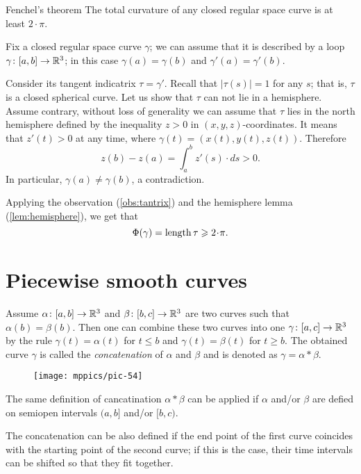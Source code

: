 \begin{thm}{Fenchel's theorem}\label{thm:fenchel}
The total curvature of any closed regular space curve is at least $2\cdot\pi$.
\end{thm}

Fix a closed regular space curve $\gamma$;
we can assume that it is described by a loop $\gamma\colon[a,b]\to \mathbb{R}^3$;
in this case $\gamma(a)=\gamma(b)$ and $\gamma'(a)=\gamma'(b)$.

Consider its tangent indicatrix $\tau=\gamma'$.
Recall that $|\tau(s)|=1$ for any $s$; that is, $\tau$ is a closed spherical curve.
Let us show that $\tau$ can not lie in a hemisphere.
Assume contrary, without loss of generality we can assume that $\tau$ lies in the north hemisphere defined by the inequality $z>0$ in $(x,y,z)$-coordinates.
It means that $z'(t)>0$ at any time, where $\gamma(t)=(x(t), y(t), z(t))$.
Therefore 
\[z(b)-z(a)=\int_a^bz'(s)\cdot ds>0.\]
In particular, $\gamma(a)\ne \gamma(b)$, a contradiction.

Applying the observation (\ref{obs:tantrix}) and the hemisphere lemma (\ref{lem:hemisphere}), we get that 
\[\tc\gamma=\length \tau\ge2\cdot\pi.\]
\qedsf

\section*{Piecewise smooth curves}

Assume $\alpha\colon[a,b]\to \mathbb{R}^3$ and $\beta\:[b,c]\z\to \RR^3$ are two curves such that $\alpha(b)=\beta(b)$.
Then one can combine these two curves into one $\gamma\:[a,c]\z\to \RR^3$ by the rule $\gamma(t)=\alpha(t)$ for $t\le b$ and $\gamma(t) = \beta(t)$ for $t\ge b$.
The obtained curve $\gamma$ is called the 
\emph{concatenation} of $\alpha$ and $\beta$ and is denoted as $\gamma=\alpha{*}\beta$.

\begin{wrapfigure}{r}{30 mm}
\vskip-0mm
\centering
\texttt{[image: mppics/pic-54]}
\end{wrapfigure}

The same definition of cancatination $\alpha{*}\beta$ can be applied if $\alpha$ and/or $\beta$ are defied on semiopen intervals 
$(a,b]$ and/or $[b,c)$.

The concatenation can be also defined if the end point of the first curve coincides with the starting point of the second curve; if this is the case, their time intervals can be shifted so that they fit together. 

